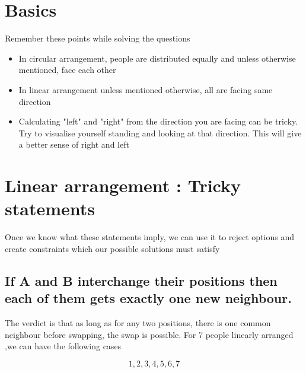 \section{Basics}

Remember these points while solving the questions
\begin{itemize}
    \item In circular arrangement, people are distributed equally and unless otherwise mentioned, face each other
    \item In linear arrangement unless mentioned otherwise, all are facing same direction
    \item Calculating "left" and "right" from the direction you are facing can be tricky. Try to visualise yourself standing and looking at that direction. This will give a better sense of right and left
\end{itemize}

\section{Linear arrangement : Tricky statements}

Once we know what these statements imply, we can use it to reject options and create constraints which our possible solutions must satisfy

\subsection{If A and B interchange their positions then each of them gets exactly one new neighbour. }

The verdict is that as long as for any two positions, there is one common neighbour before swapping, the swap is possible. For 7 people linearly arranged ,we can have the following cases

$$
1   ,   2   ,   3  ,    4   ,  5    ,  6    ,  7
$$

